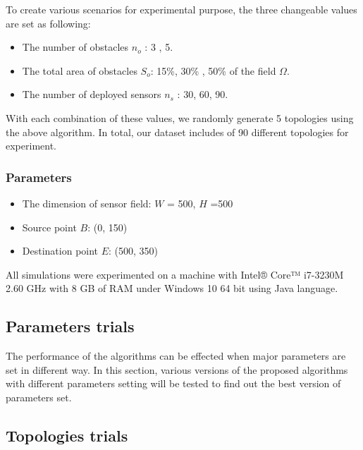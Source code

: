 \documentclass[final]{elsarticle}
\begin{document}
To create various scenarios for experimental purpose, the three changeable values are set as following:\cite{b10}
\begin{itemize}
	\item The number of obstacles $n_o$ : 3 , 5.
	\item The total area of obstacles $S_o$: 15\%, 30\% , 50\% of the field $\Omega$.
	\item The number of deployed sensors $n_s$ : 30, 60, 90.
\end{itemize}
With each combination of these values, we randomly generate 5 topologies using the above algorithm. In total, our dataset includes of 90 different topologies for experiment.

\subsubsection{Parameters}
\begin{itemize}
	\item The dimension of sensor field: $ W $ = 500, $ H $ =500
	\item Source point $ B $: (0, 150) 
	\item Destination point $ E $: (500, 350)	
\end{itemize}
All simulations were experimented on a machine with Intel® Core™ i7-3230M 2.60 GHz with 8 GB of RAM under Windows 10 64 bit using Java language.
\subsection{Parameters trials}
The performance of the algorithms can be effected when major parameters are set in different way. In this section, various versions of the proposed algorithms with different parameters setting will be tested to find out the best version of parameters set.

\subsection{Topologies trials}

\begin{landscape}
	
\end{landscape}

\end{document}

